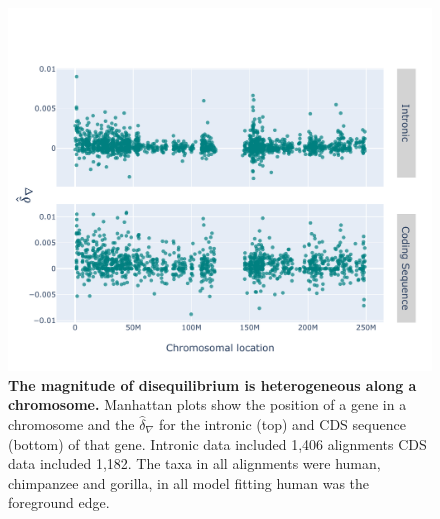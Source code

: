 \begin{figure}[htbp]
\centering
\includegraphics[width=	\textwidth]{figures/plots/primate/d-conv-manhatten.pdf}
\caption{\textbf{The magnitude of disequilibrium is heterogeneous along a chromosome.} Manhattan plots show the position of a gene in a chromosome and the $\hat\delta_\nabla$ for the intronic (top) and CDS sequence (bottom) of that gene. Intronic data included 1,406 alignments CDS data included 1,182. The taxa in all alignments were human, chimpanzee and gorilla, in all model fitting human was the foreground edge. }
\label{fig:primate:dconv-manhattan}
\end{figure}
